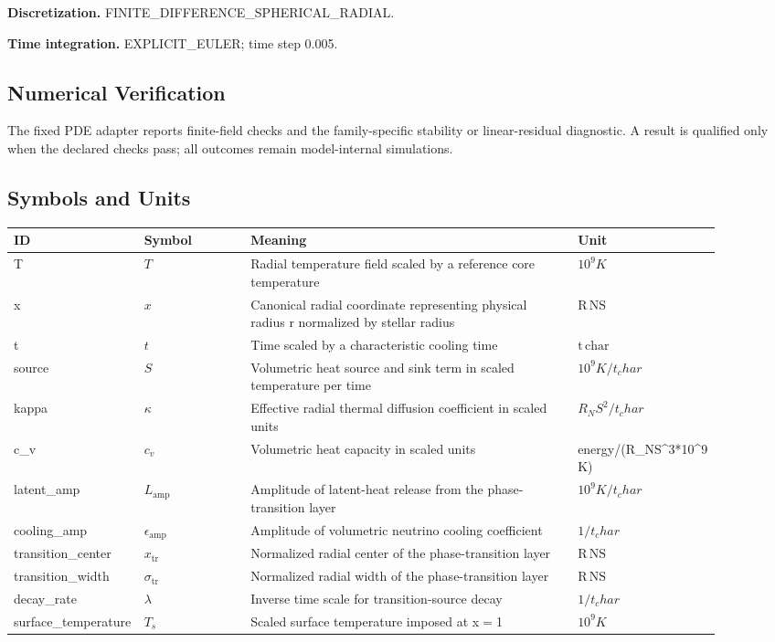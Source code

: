 \documentclass[11pt]{article}
\begin{document}
\noindent\textbf{Discretization.} FINITE\_DIFFERENCE\_SPHERICAL\_RADIAL.

\noindent\textbf{Time integration.} EXPLICIT\_EULER; time step 0.005.

\subsection{Numerical Verification}

\noindent The fixed PDE adapter reports finite-field checks and the family-specific stability or linear-residual diagnostic. A result is qualified only when the declared checks pass; all outcomes remain model-internal simulations.

\subsection{Symbols and Units}

\begin{center}
\small
\begin{tabular}{|p{0.12\linewidth}|p{0.15\linewidth}|p{0.46\linewidth}|p{0.17\linewidth}|}
\hline
ID & Symbol & Meaning & Unit \\ \hline
T & $T$ & Radial temperature field scaled by a reference core temperature & $10^9 K$ \\ \hline
x & $x$ & Canonical radial coordinate representing physical radius r normalized by stellar radius & $\mathrm{R}\,\mathrm{NS}$ \\ \hline
t & $t$ & Time scaled by a characteristic cooling time & $\mathrm{t}\,\mathrm{char}$ \\ \hline
source & $S$ & Volumetric heat source and sink term in scaled temperature per time & $10^9 K/t_char$ \\ \hline
kappa & $\kappa$ & Effective radial thermal diffusion coefficient in scaled units & $R_NS^2/t_char$ \\ \hline
c\_v & $c_v$ & Volumetric heat capacity in scaled units & energy/(R\_NS\textasciicircum{}3*10\textasciicircum{}9 K) \\ \hline
latent\_amp & $L_{\mathrm{amp}}$ & Amplitude of latent-heat release from the phase-transition layer & $10^9 K/t_char$ \\ \hline
cooling\_amp & $\epsilon_{\mathrm{amp}}$ & Amplitude of volumetric neutrino cooling coefficient & $1/t_char$ \\ \hline
transition\_center & $x_{\mathrm{tr}}$ & Normalized radial center of the phase-transition layer & $\mathrm{R}\,\mathrm{NS}$ \\ \hline
transition\_width & $\sigma_{\mathrm{tr}}$ & Normalized radial width of the phase-transition layer & $\mathrm{R}\,\mathrm{NS}$ \\ \hline
decay\_rate & $\lambda$ & Inverse time scale for transition-source decay & $1/t_char$ \\ \hline
surface\_temperature & $T_s$ & Scaled surface temperature imposed at x\ensuremath{=}1 & $10^9 K$ \\ \hline
\end{tabular}
\end{center}
\end{document}
